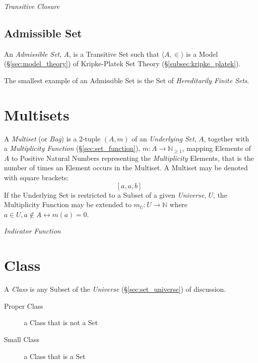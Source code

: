 \documentclass{article}
\begin{document}
\emph{Transitive Closure}

\subsection{Admissible Set}\label{subsec:admissible_set}

An \emph{Admissible Set}, $A$, is a Transitive Set such that $\langle
A, \in \rangle$ is a Model (\S\ref{sec:model_theory}) of Kripke-Platek
Set Theory (\S\ref{subsec:kripke_platek}).

The smallest example of an Admissible Set is the Set of
\emph{Hereditarily Finite Sets}. %



\section{Multisets}\label{sec:multi_sets}

A \emph{Multiset} (or \emph{Bag}) is a 2-tuple $(A,m)$ of an
\emph{Underlying Set}, $A$, together with a \emph{Multiplicity
  Function} (\S\ref{sec:set_function}), $m : A \rightarrow
\mathbb{N}_{\geq 1}$, mapping Elements of $A$ to Positive Natural
Numbers representing the \emph{Multiplicity} Elements, that is the
number of times an Element occurs in the Multiset. A Multiset may be
denoted with square brackets:
\[
    [a,a,b]
\]
If the Underlying Set is restricted to a Subset of a given
\emph{Universe}, $U$, the Multiplicity Function may be extended to
$m_U : U \rightarrow \mathbb{N}$ where $a \in U, a \notin A
\leftrightarrow m(a)=0$.

\emph{Indicator Function}



\section{Class}\label{sec:class}

A \emph{Class} is any Subset of the \emph{Universe}
(\S\ref{sec:set_universe}) of discussion.

\begin{description}
    \item [Proper Class] a Class that is not a Set
    \item [Small Class] a Class that is a Set
\end{description}
\end{document}
